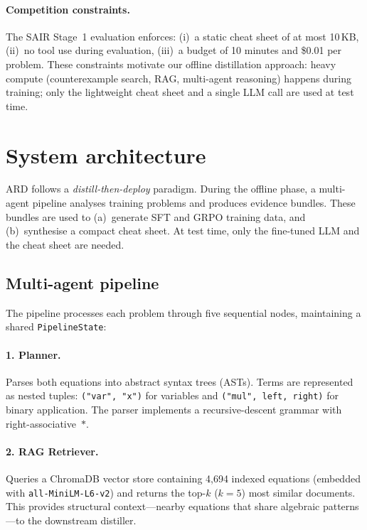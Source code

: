 \documentclass{article}
\begin{document}
\paragraph{Competition constraints.} The SAIR Stage~1 evaluation enforces: (i)~a static cheat sheet of at most 10\,KB, (ii)~no tool use during evaluation, (iii)~a budget of 10 minutes and \$0.01 per problem. These constraints motivate our offline distillation approach: heavy compute (counterexample search, RAG, multi-agent reasoning) happens during training; only the lightweight cheat sheet and a single LLM call are used at test time.

\section{System architecture}
\label{sec:architecture}

ARD follows a \emph{distill-then-deploy} paradigm. During the offline phase, a multi-agent pipeline analyses training problems and produces evidence bundles. These bundles are used to (a)~generate SFT and GRPO training data, and (b)~synthesise a compact cheat sheet. At test time, only the fine-tuned LLM and the cheat sheet are needed.

\subsection{Multi-agent pipeline}
\label{sec:agents}

The pipeline processes each problem through five sequential nodes, maintaining a shared \texttt{PipelineState}:

\paragraph{1. Planner.} Parses both equations into abstract syntax trees (ASTs). Terms are represented as nested tuples: \texttt{("var",\,"x")} for variables and \texttt{("mul",\,left,\,right)} for binary application. The parser implements a recursive-descent grammar with right-associative~$*$.

\paragraph{2. RAG Retriever.} Queries a ChromaDB vector store containing 4,694 indexed equations (embedded with \texttt{all-MiniLM-L6-v2}) and returns the top-$k$ ($k{=}5$) most similar documents. This provides structural context---nearby equations that share algebraic patterns---to the downstream distiller.
\end{document}
